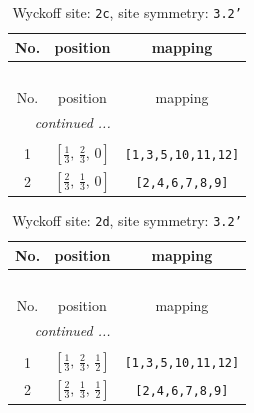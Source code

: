 \documentclass[fleqn,8pt]{jsarticle}
\begin{document}
\begin{longtable}{ccc}
\caption{Wyckoff site: {\tt 2c}, site symmetry: {\tt 3.2'}}
 \\
 \hline \hline
No. & position & mapping \\ \hline \endfirsthead

\multicolumn{2}{l}{\tablename\ \thetable{}} \\
 \hline \hline
No. & position & mapping \\ \hline \endhead

 \hline \hline
\multicolumn{2}{r}{\footnotesize\it continued ...} \\ \endfoot

 \hline \hline
\multicolumn{2}{r}{} \\ \endlastfoot

1 & $\left[ \frac{1}{3},\, \frac{2}{3},\, 0 \right]$ & {\tt [1,3,5,10,11,12]} \\ \hline
2 & $\left[ \frac{2}{3},\, \frac{1}{3},\, 0 \right]$ & {\tt [2,4,6,7,8,9]} \\
\end{longtable}
\renewcommand{\arraystretch}{1.2}
\begin{longtable}{ccc}
\caption{Wyckoff site: {\tt 2d}, site symmetry: {\tt 3.2'}}
 \\
 \hline \hline
No. & position & mapping \\ \hline \endfirsthead

\multicolumn{2}{l}{\tablename\ \thetable{}} \\
 \hline \hline
No. & position & mapping \\ \hline \endhead

 \hline \hline
\multicolumn{2}{r}{\footnotesize\it continued ...} \\ \endfoot

 \hline \hline
\multicolumn{2}{r}{} \\ \endlastfoot

1 & $\left[ \frac{1}{3},\, \frac{2}{3},\, \frac{1}{2} \right]$ & {\tt [1,3,5,10,11,12]} \\ \hline
2 & $\left[ \frac{2}{3},\, \frac{1}{3},\, \frac{1}{2} \right]$ & {\tt [2,4,6,7,8,9]} \\
\end{longtable}
\renewcommand{\arraystretch}{1.2}
\end{document}
